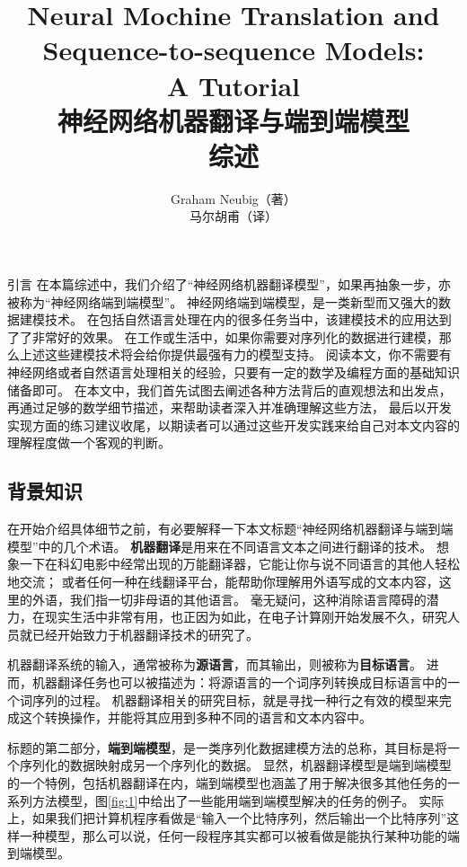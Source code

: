 \documentclass[10pt,a4paper]{ctexart}
\title{Neural Mochine Translation and Sequence-to-sequence Models:\\A Tutorial \\ 神经网络机器翻译与端到端模型\\综述}
\author{Graham Neubig（著）\\马尔胡甫（译）}
\date{}
\makeatletter
\renewcommand{\section}{\@startsection{section}{1}{0mm}
  {-\baselineskip}{0.5\baselineskip}{\bf\leftline}}
\makeatother
\begin{document}
\maketitle

\newpage

\tableofcontents

\newpage

\section{引言}
在本篇综述中，我们介绍了“神经网络机器翻译模型”，如果再抽象一步，亦被称为“神经网络端到端模型”。
神经网络端到端模型，是一类新型而又强大的数据建模技术。
在包括自然语言处理在内的很多任务当中，该建模技术的应用达到了了非常好的效果。
在工作或生活中，如果你需要对序列化的数据进行建模，那么上述这些建模技术将会给你提供最强有力的模型支持。
阅读本文，你不需要有神经网络或者自然语言处理相关的经验，只要有一定的数学及编程方面的基础知识储备即可。
在本文中，我们首先试图去阐述各种方法背后的直观想法和出发点，再通过足够的数学细节描述，来帮助读者深入并准确理解这些方法，
最后以开发实现方面的练习建议收尾，以期读者可以通过这些开发实践来给自己对本文内容的理解程度做一个客观的判断。

\subsection{背景知识}
在开始介绍具体细节之前，有必要解释一下本文标题“神经网络机器翻译与端到端模型”中的几个术语。
\textbf{机器翻译}是用来在不同语言文本之间进行翻译的技术。
想象一下在科幻电影中经常出现的万能翻译器，它能让你与说不同语言的其他人轻松地交流；
或者任何一种在线翻译平台，能帮助你理解用外语写成的文本内容，这里的外语，我们指一切非母语的其他语言。
毫无疑问，这种消除语言障碍的潜力，在现实生活中非常有用，也正因为如此，在电子计算刚开始发展不久，研究人员就已经开始致力于机器翻译技术的研究了。

机器翻译系统的输入，通常被称为\textbf{源语言}，而其输出，则被称为\textbf{目标语言}。
进而，机器翻译任务也可以被描述为：将源语言的一个词序列转换成目标语言中的一个词序列的过程。
机器翻译相关的研究目标，就是寻找一种行之有效的模型来完成这个转换操作，并能将其应用到多种不同的语言和文本内容中。

标题的第二部分，\textbf{端到端模型}，是一类序列化数据建模方法的总称，其目标是将一个序列化的数据映射成另一个序列化的数据。
显然，机器翻译模型是端到端模型的一个特例，包括机器翻译在内，端到端模型也涵盖了用于解决很多其他任务的一系列方法模型，图\ref{fig:1}中给出了一些能用端到端模型解决的任务的例子。
实际上，如果我们把计算机程序看做是“输入一个比特序列，然后输出一个比特序列”这样一种模型，那么可以说，任何一段程序其实都可以被看做是能执行某种功能的端到端模型。
\end{document}
